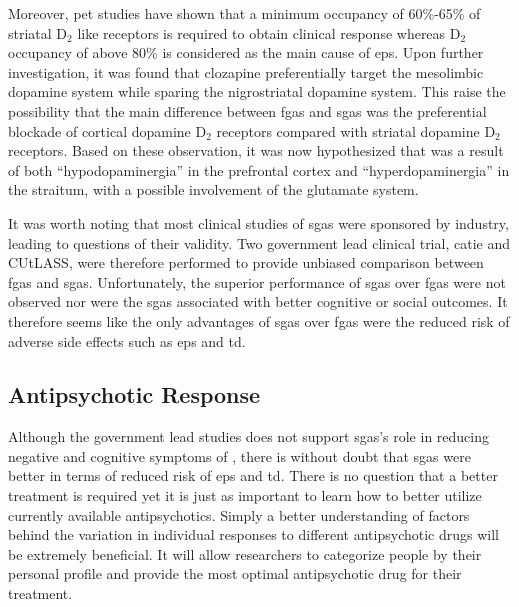 	Moreover, \gls{pet} studies have shown that a minimum occupancy of 60\%-65\% of striatal D$_2$ like receptors is required to obtain clinical response whereas D$_2$ occupancy of above 80\% is considered as the main cause of \gls{eps}\citep{Arranz2007,Kapur2003}.
	Upon further investigation, it was found that clozapine preferentially target the mesolimbic dopamine system while sparing the nigrostriatal dopamine system\citep{Gardner1993}.
	This raise the possibility that the main difference between \glspl{fga} and \glspl{sga} was the preferential blockade of cortical dopamine D$_2$ receptors compared with striatal dopamine D$_2$ receptors\citep{Kapur2003}.
	Based on these observation, it was now hypothesized that  was a result of both ``hypodopaminergia'' in the prefrontal cortex and ``hyperdopaminergia'' in the straitum, with a possible involvement of the glutamate system\citep{Howes2009}.
	
	It was worth noting that most clinical studies of \glspl{sga} were sponsored by industry, leading to questions of their validity. 
	Two government lead clinical trial, \gls{catie}\citep{Lieberman2005} and CUtLASS\citep{Jones2006}, were therefore performed to provide unbiased comparison between \glspl{fga} and \glspl{sga}.
	Unfortunately, the superior performance of \glspl{sga} over \glspl{fga} were not observed nor were the \glspl{sga} associated with better cognitive or social outcomes.
	It therefore seems like the only advantages of \glspl{sga} over \glspl{fga} were the reduced risk of adverse side effects such as \gls{eps} and \gls{td}.
	
	\subsection{Antipsychotic Response}
	Although the government lead studies does not support \glspl{sga}'s role in reducing negative and cognitive symptoms of , there is without doubt that \glspl{sga} were better in terms of reduced risk of \gls{eps} and \gls{td}. 
	There is no question that a better treatment is required yet it is just as important to learn how to better utilize currently available antipsychotics. 
	Simply a better understanding of factors behind the variation in individual responses to different antipsychotic drugs will be extremely beneficial. 
	It will allow researchers to categorize people by their personal profile and provide the most optimal antipsychotic drug for their treatment. 
	

